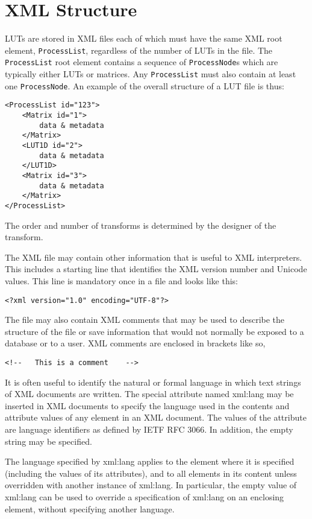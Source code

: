 \regularsectionformat
\chapter{XML Structure}
\label{sec:XMLstructure}

LUTs are stored in XML files each of which must have the same XML root element, \texttt{ProcessList}, regardless of the number of LUTs in the file. The \texttt{ProcessList} root element contains a sequence of \texttt{ProcessNode}s which are typically either LUTs or matrices. Any \texttt{ProcessList} must also contain at least one \texttt{ProcessNode}. An example of the overall structure of a LUT file is thus:

\lstset{frame=none}
\begin{lstlisting}
<ProcessList id="123">
	<Matrix id="1">
		data & metadata
	</Matrix>
	<LUT1D id="2">
 		data & metadata
	</LUT1D>
	<Matrix id="3">
		data & metadata
	</Matrix>
</ProcessList>	
\end{lstlisting}

The order and number of transforms is determined by the designer of the transform.

The XML file may contain other information that is useful to XML interpreters.  This includes a starting line that identifies the XML version number and Unicode values.  This line is mandatory once in a file and looks like this:

\begin{lstlisting}
<?xml version="1.0" encoding="UTF-8"?>
\end{lstlisting}

The file may also contain XML comments that may be used to describe the structure of the file or save information that would not normally be exposed to a database or to a user.
XML comments are enclosed in brackets like so,     

\begin{lstlisting}
<!--   This is a comment    -->
\end{lstlisting}
\lstset{frame=single}

It is often useful to identify the natural or formal language in which text strings of XML documents are written.  The special attribute named xml:lang may be inserted in XML documents to specify the language used in the contents and attribute values of any element in an XML document. The values of the attribute are language identifiers as defined by IETF RFC 3066. In addition, the empty string may be specified.

The language specified by xml:lang applies to the element where it is specified (including the values of its attributes), and to all elements in its content unless overridden with another instance of xml:lang. In particular, the empty value of xml:lang can be used to override a specification of xml:lang on an enclosing element, without specifying another language.